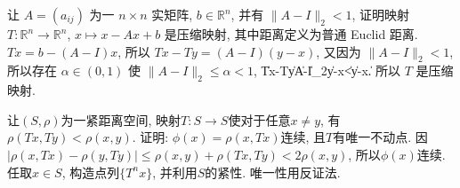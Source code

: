 让 $A=(a_{ij})$ 为一 $n\times n$ 实矩阵, $b\in\mathbb{R}^n$, 并有 $\|A-I\|_2<1$, 证明映射 $T:\mathbb{R}^n\to\mathbb{R}^n$, $x\mapsto x-Ax+b$ 是压缩映射,
其中距离定义为普通 Euclid 距离.
\eq
\ba
$Tx=b-(A-I)x$, 所以 $Tx-Ty=(A-I)(y-x)$, 又因为 $\|A-I\|_2<1$, 所以存在 $\alpha\in(0,1)$ 使 $\|A-I\|_2\le \alpha<1$, 
\bee
\|Tx-Ty\|\le \|A-I\|_2\cdot\|y-x\|<\alpha\|y-x\|.
\eee
所以 $T$ 是压缩映射.
\ea

让$(S,\rho)$为一紧距离空间, 映射$T:S\to S$使对于任意$x\ne y$, 有$\rho(Tx, Ty)<\rho(x,y)$.
证明: $\phi(x)=\rho(x,Tx)$连续, 且$T$有唯一不动点.
\eq
\ba
因$|\rho(x, Tx)-\rho(y,Ty)|\le \rho(x,y)+\rho(Tx, Ty)<2\rho(x,y)$, 所以$\phi(x)$连续. 任取$x\in S$, 构造点列$\{T^nx\}$, 并利用$S$的紧性.
唯一性用反证法.
\ea

